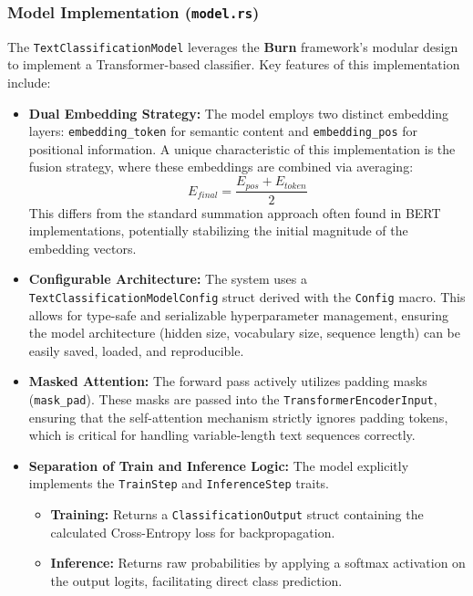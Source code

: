 \documentclass{ieeeaccess}
\begin{document}
\subsubsection{Model Implementation (\texttt{model.rs})}
The \texttt{TextClassificationModel} leverages the \textbf{Burn} framework's modular design to implement a Transformer-based classifier. Key features of this implementation include:
\begin{itemize}
    \item \textbf{Dual Embedding Strategy:} The model employs two distinct embedding layers: \texttt{embedding\_token} for semantic content and \texttt{embedding\_pos} for positional information. A unique characteristic of this implementation is the fusion strategy, where these embeddings are combined via averaging:
    \[
    E_{final} = \frac{E_{pos} + E_{token}}{2}
    \]
    This differs from the standard summation approach often found in BERT implementations, potentially stabilizing the initial magnitude of the embedding vectors.
    
    \item \textbf{Configurable Architecture:} The system uses a \texttt{TextClassificationModelConfig} struct derived with the \texttt{Config} macro. This allows for type-safe and serializable hyperparameter management, ensuring the model architecture (hidden size, vocabulary size, sequence length) can be easily saved, loaded, and reproducible.
    
    \item \textbf{Masked Attention:} The forward pass actively utilizes padding masks (\texttt{mask\_pad}). These masks are passed into the \texttt{TransformerEncoderInput}, ensuring that the self-attention mechanism strictly ignores padding tokens, which is critical for handling variable-length text sequences correctly.
    
    \item \textbf{Separation of Train and Inference Logic:} The model explicitly implements the \texttt{TrainStep} and \texttt{InferenceStep} traits. 
    \begin{itemize}
        \item \textbf{Training:} Returns a \texttt{ClassificationOutput} struct containing the calculated Cross-Entropy loss for backpropagation.
        \item \textbf{Inference:} Returns raw probabilities by applying a softmax activation on the output logits, facilitating direct class prediction.
    \end{itemize}
\end{itemize}
\end{document}
